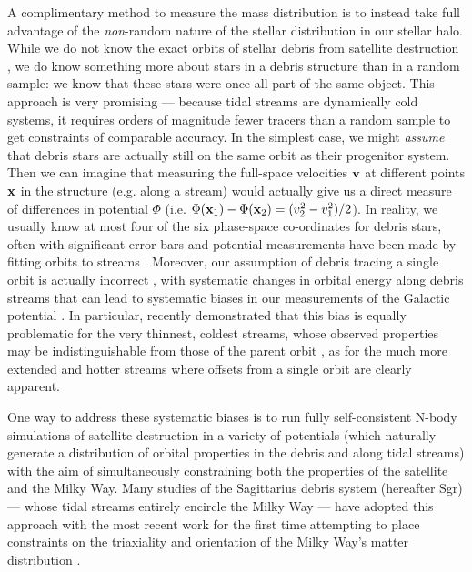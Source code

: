 \documentclass[preprint]{aastex}
\begin{document}
A complimentary method to measure the mass distribution is to instead take full advantage of the {\it non}-random nature of the stellar distribution in our stellar halo.
While we do not know the exact orbits of  stellar debris from satellite destruction \citep[although][proposes a method of orbit reconstruction from limited dimensions of
observations]{eyre09b}, we do know something more about stars in a debris structure than in a random sample: we know that these stars were once all part of the same
object.
This approach is very promising --- because tidal streams are dynamically cold systems, it requires orders of magnitude fewer tracers than a random sample to get
constraints of comparable accuracy.
In the simplest case, we might {\it assume} that debris stars are actually still on the same orbit as their progenitor system.
Then we can imagine that measuring the full-space velocities ${\bf v}$ at different points ${\bf x}$ in the structure (e.g. along a stream) would actually give us a direct
measure of differences in potential $\Phi$ (i.e. $\Phi({\bf x}_1)-\Phi({\bf x}_2)=(v_2^2-v_1^2)/2$).
In reality, we usually know at most four of the six phase-space co-ordinates for debris stars, often with significant error bars and potential measurements have been made by
fitting orbits to streams \citep[e.g.,][]{helmi04,johnston05,koposov10,law10}.
Moreover, our assumption of debris tracing a single orbit is actually incorrect \citep[see][for discussions of the orbit distribution in tidal debris]{johnston98,helmi99}, with
systematic changes in orbital energy along debris streams that can lead to systematic biases in our measurements of the Galactic potential \citep{eyre09a,varghese11}.
In particular, \citet{sanders13a} recently demonstrated that this bias is equally problematic for the very thinnest, coldest streams, whose observed properties may be indistinguishable from those of the parent orbit \citep[e.g. such as the globular cluster, GD1 --- see][]{koposov10}, as for the much more extended and hotter streams \citep[e.g. such as debris from the Sagittarius dwarf galaxy --- see][]{majewski03} where offsets from a single orbit are clearly apparent.

One way to address these systematic biases is to run fully self-consistent N-body simulations of satellite destruction in a variety of potentials (which naturally generate a
distribution of orbital properties in the debris and along tidal streams) with the aim of simultaneously constraining both the properties of the satellite and the Milky Way.
Many studies of the Sagittarius debris system (hereafter Sgr)  --- whose tidal streams entirely encircle the Milky Way --- have adopted this approach \citep[e.g.][]
{law05,fellhauer06} with the most recent work for the first time attempting to place constraints on the triaxiality and orientation of the Milky Way's matter distribution
\citep{law10}.
\end{document}
